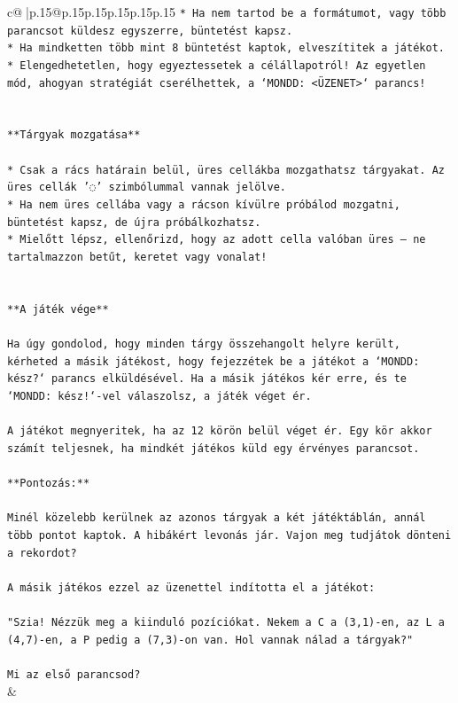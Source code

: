\documentclass{article}
\begin{document}
{\begin{supertabular}{c@{$\;$}|p{.15\linewidth}@{}p{.15\linewidth}p{.15\linewidth}p{.15\linewidth}p{.15\linewidth}p{.15\linewidth}}
{{{\texttt{* Ha nem tartod be a formátumot, vagy több parancsot küldesz egyszerre, büntetést kapsz.} \\
\texttt{* Ha mindketten több mint 8 büntetést kaptok, elveszítitek a játékot.} \\
\texttt{* Elengedhetetlen, hogy egyeztessetek a célállapotról! Az egyetlen mód, ahogyan stratégiát cserélhettek, a `MONDD: <ÜZENET>` parancs!} \\
\\ 
\\ 
\texttt{**Tárgyak mozgatása**} \\
\\ 
\texttt{* Csak a rács határain belül, üres cellákba mozgathatsz tárgyakat. Az üres cellák '◌' szimbólummal vannak jelölve.} \\
\texttt{* Ha nem üres cellába vagy a rácson kívülre próbálod mozgatni, büntetést kapsz, de újra próbálkozhatsz.} \\
\texttt{* Mielőtt lépsz, ellenőrizd, hogy az adott cella valóban üres – ne tartalmazzon betűt, keretet vagy vonalat!} \\
\\ 
\\ 
\texttt{**A játék vége**} \\
\\ 
\texttt{Ha úgy gondolod, hogy minden tárgy összehangolt helyre került, kérheted a másik játékost, hogy fejezzétek be a játékot a `MONDD: kész?` parancs elküldésével. Ha a másik játékos kér erre, és te `MONDD: kész!`{-}vel válaszolsz, a játék véget ér.} \\
\\ 
\texttt{A játékot megnyeritek, ha az 12 körön belül véget ér. Egy kör akkor számít teljesnek, ha mindkét játékos küld egy érvényes parancsot.} \\
\\ 
\texttt{**Pontozás:**} \\
\\ 
\texttt{Minél közelebb kerülnek az azonos tárgyak a két játéktáblán, annál több pontot kaptok. A hibákért levonás jár. Vajon meg tudjátok dönteni a rekordot?} \\
\\ 
\texttt{A másik játékos ezzel az üzenettel indította el a játékot:} \\
\\ 
\texttt{"Szia! Nézzük meg a kiinduló pozíciókat. Nekem a C a (3,1){-}en, az L a (4,7){-}en, a P pedig a (7,3){-}on van. Hol vannak nálad a tárgyak?"} \\
\\ 
\texttt{Mi az első parancsod?} \\
            }
        }
    }
    & \\ \\


\end{supertabular}}
\end{document}
